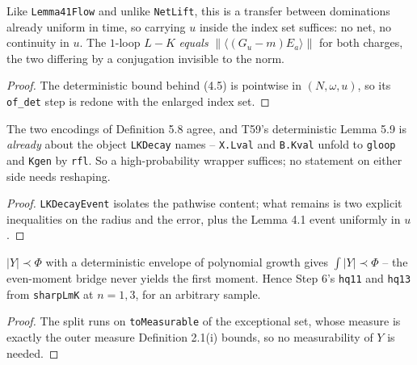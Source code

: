 \begin{lemma}\label{lem:eq45flow}
  \leanok{}
  Like \texttt{Lemma41Flow} and unlike \texttt{NetLift}, this is a transfer between dominations
  already uniform in time, so carrying $u$ inside the index set suffices: no net, no continuity in
  $u$. The $1$-loop $L-K$ \emph{equals} $\|\langle(G_u-m)E_a\rangle\|$ for both charges, the two
  differing by a conjugation invisible to the norm.
\end{lemma}
\begin{proof}\leanok
  The deterministic bound behind (4.5) is pointwise in $(N,\omega,u)$, so its \texttt{of\_det} step
  is redone with the enlarged index set.
\end{proof}

\begin{lemma}\label{lem:decaybridge}
  \leanok{}
  The two encodings of Definition 5.8 agree, and T59's deterministic Lemma 5.9 is \emph{already}
  about the object \texttt{LKDecay} names -- \texttt{X.Lval} and \texttt{B.Kval} unfold to
  \texttt{gloop} and \texttt{Kgen} by \texttt{rfl}. So a high-probability wrapper suffices; no
  statement on either side needs reshaping.
\end{lemma}
\begin{proof}\leanok
  \texttt{LKDecayEvent} isolates the pathwise content; what remains is two explicit inequalities on
  the radius and the error, plus the Lemma 4.1 event uniformly in $u$.
\end{proof}

\begin{lemma}\label{lem:firstmoment}
  \leanok{}
  $|Y|\prec\Phi$ with a deterministic envelope of polynomial growth gives
  $\int|Y|\prec\Phi$ -- the even-moment bridge never yields the first moment. Hence Step 6's
  \texttt{hq11} and \texttt{hq13} from \texttt{sharpLmK} at $n=1,3$, for an arbitrary sample.
\end{lemma}
\begin{proof}\leanok
  The split runs on \texttt{toMeasurable} of the exceptional set, whose measure is exactly the outer
  measure Definition 2.1(i) bounds, so no measurability of $Y$ is needed.
\end{proof}

